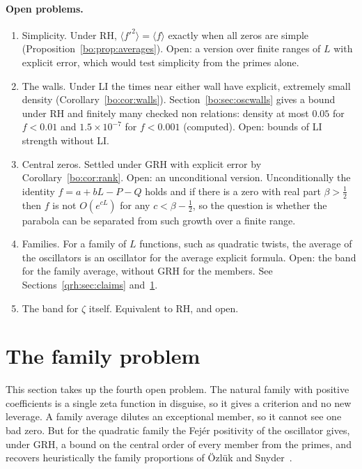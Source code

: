 \paragraph{Open problems.}
\begin{enumerate}
\item Simplicity. Under RH, $\langle f'^2\rangle=\langle f\rangle$ exactly when all zeros are simple (Proposition~\ref{bo:prop:averages}). Open: a version over finite ranges of $L$ with explicit error, which would test simplicity from the primes alone.
\item The walls. Under LI the times near either wall have explicit, extremely small density (Corollary~\ref{bo:cor:walls}). Section~\ref{bo:sec:oscwalls} gives a bound under RH and finitely many checked non relations: density at most $0.05$ for $f<0.01$ and $1.5\times10^{-7}$ for $f<0.001$ (computed). Open: bounds of LI strength without LI.
\item Central zeros. Settled under GRH with explicit error by Corollary~\ref{bo:cor:rank}. Open: an unconditional version. Unconditionally the identity $f=a+bL-P-Q$ holds and if there is a zero with real part $\beta>\frac12$ then $f$ is not $O(e^{cL})$ for any $c<\beta-\frac12$, so the question is whether the parabola can be separated from such growth over a finite range.
\item Families. For a family of $L$ functions, such as quadratic twists, the average of the oscillators is an oscillator for the average explicit formula. Open: the band for the family average, without GRH for the members. See Sections~\ref{qrh:sec:claims} and~\ref{bo:sec:oscfamily}.
\item The band for $\zeta$ itself. Equivalent to RH, and open.
\end{enumerate}

\section{The family problem}\label{bo:sec:oscfamily}

This section takes up the fourth open problem. The natural family with positive coefficients is a single zeta function in disguise, so it gives a criterion and no new leverage. A family average dilutes an exceptional member, so it cannot see one bad zero. But for the quadratic family the Fej\'er positivity of the oscillator gives, under GRH, a bound on the central order of every member from the primes, and recovers heuristically the family proportions of \"Ozl\"uk and Snyder~\cite{OzlukSnyder99}.

